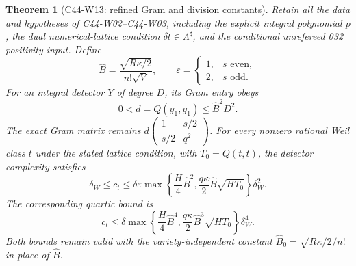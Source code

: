 \documentclass[11pt]{article}
\newtheorem{theorem}{Theorem}[section]
\theoremstyle{remark}\newtheorem{remark}[theorem]{Remark}
\begin{document}
\begin{theorem}[C44-W13: refined Gram and division constants]
Retain all the data and hypotheses of C44-W02--C44-W03, including
the explicit integral polynomial $p$, the dual numerical-lattice
condition $\delta t\in\Lambda^\sharp$, and the conditional
unrefereed 032 positivity input. Define
\[
 \widehat B=\frac{\sqrt{R\kappa/2}}{n!\sqrt V},\qquad
 \varepsilon=
 \begin{cases}1,&s\text{ even},\\2,&s\text{ odd}.
 \end{cases}
 \tag{C44.W13.1}
\]
For an integral detector $Y$ of degree $D$, its Gram entry obeys
\[
                  0<d=Q(y_1,y_1)\leq\widehat B^2D^2.
 \tag{C44.W13.2}
\]
The exact Gram matrix remains
$d\left(\begin{smallmatrix}1&s/2\\s/2&q^2\end{smallmatrix}\right)$.
For every nonzero rational Weil class $t$ under the stated lattice
condition, with $T_0=Q(t,t)$, the detector complexity satisfies
\[
 \delta_W\leq c_t\leq
 \delta\varepsilon\max\left\{
          \frac H4\widehat B^2,
          \frac{q\kappa}{2}\widehat B\sqrt{HT_0}\right\}
                                        \delta_W^2.
 \tag{C44.W13.3}
\]
The corresponding quartic bound is
\[
 c_t\leq\delta\max\left\{
          \frac H4\widehat B^4,
          \frac{q\kappa}{2}\widehat B^3\sqrt{HT_0}\right\}
                                        \delta_W^4.
 \tag{C44.W13.4}
\]
Both bounds remain valid with the variety-independent constant
$\widehat B_0=\sqrt{R\kappa/2}/n!$ in place of $\widehat B$.
\end{theorem}
\end{document}
